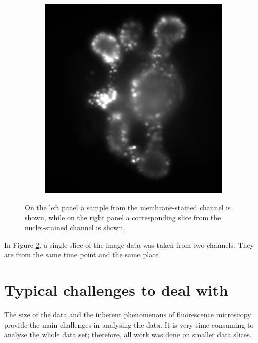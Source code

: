 \documentclass[
  digital,     %
  oneside,     %
  nosansbold,  %
  nocolorbold, %
  lof,         %
  lot,         %
]{fithesis4}
\begin{document}
\begin{figure}
\begin{subfigure}[t]{0.4\textwidth}
        \includegraphics[width=\textwidth]{resources/C2-t006-200-scaled.jpg}
        \caption{}
        \label{fig:data_example_nuclei}
    \end{subfigure}
    \caption{On the left panel a sample from the membrane-stained channel is shown, while on the right panel a corresponding slice from the nuclei-stained channel is shown.}
    \label{fig:data_example}
\end{figure}
In Figure \ref{fig:data_example}, a single slice of the image data was taken from
two channels. They are from the same time point and the same place.

\section{Typical challenges to deal with}

The size of the data and the inherent phenomenons of fluorescence microscopy
provide the main challenges in analysing the data. It is very time-consuming to
analyse the whole data set; therefore, all work was done on smaller data slices.
\end{document}
